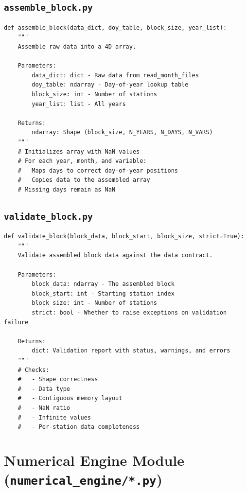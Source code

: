 ﻿\documentclass[12pt,a4paper]{report}
\begin{document}
\subsection{\texttt{assemble\_block.py}}
\begin{lstlisting}[caption=assemble\_block.py]
def assemble_block(data_dict, doy_table, block_size, year_list):
    """
    Assemble raw data into a 4D array.
    
    Parameters:
        data_dict: dict - Raw data from read_month_files
        doy_table: ndarray - Day-of-year lookup table
        block_size: int - Number of stations
        year_list: list - All years
    
    Returns:
        ndarray: Shape (block_size, N_YEARS, N_DAYS, N_VARS)
    """
    # Initializes array with NaN values
    # For each year, month, and variable:
    #   Maps days to correct day-of-year positions
    #   Copies data to the assembled array
    # Missing days remain as NaN
\end{lstlisting}

\subsection{\texttt{validate\_block.py}}
\begin{lstlisting}[caption=validate\_block.py]
def validate_block(block_data, block_start, block_size, strict=True):
    """
    Validate assembled block data against the data contract.
    
    Parameters:
        block_data: ndarray - The assembled block
        block_start: int - Starting station index
        block_size: int - Number of stations
        strict: bool - Whether to raise exceptions on validation failure
    
    Returns:
        dict: Validation report with status, warnings, and errors
    """
    # Checks:
    #   - Shape correctness
    #   - Data type
    #   - Contiguous memory layout
    #   - NaN ratio
    #   - Infinite values
    #   - Per-station data completeness
\end{lstlisting}

\section{Numerical Engine Module (\texttt{numerical\_engine/*.py})}
\end{document}
